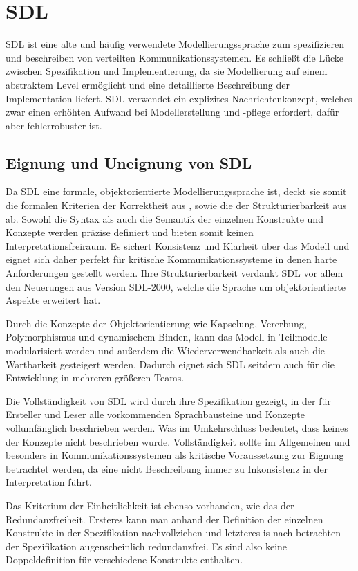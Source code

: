 \section{SDL}
\label{sc:SDLB}
\ac{SDL} ist eine alte und häufig verwendete Modellierungssprache zum spezifizieren und beschreiben von verteilten Kommunikationssystemen. 
Es schließt die Lücke zwischen Spezifikation und Implementierung, da sie Modellierung auf einem abstraktem Level ermöglicht und eine detaillierte Beschreibung der Implementation liefert. \ac{SDL} verwendet ein  explizites  Nachrichtenkonzept,  welches  zwar  einen  erhöhten  Aufwand  bei  Modellerstellung und -pflege erfordert, dafür aber fehlerrobuster ist. 
\subsection{Eignung und Uneignung von SDL}
\label{ssc:SDL_Eignung}
Da \ac{SDL} eine formale, objektorientierte Modellierungssprache ist, deckt sie somit die formalen Kriterien der Korrektheit aus \cite{ssc:Korrektheit}, sowie die der Strukturierbarkeit aus \cite{ssc:Strukturierbarkeit} ab. Sowohl die Syntax als auch die Semantik der einzelnen Konstrukte und Konzepte werden präzise definiert und bieten somit keinen Interpretationsfreiraum. Es sichert Konsistenz und Klarheit über das Modell und eignet sich daher perfekt für kritische Kommunikationssysteme in denen harte Anforderungen gestellt werden. Ihre Strukturierbarkeit verdankt \ac{SDL} vor allem den Neuerungen aus Version \ac{SDL}-2000, welche die Sprache um objektorientierte Aspekte erweitert hat.

Durch die Konzepte der Objektorientierung wie Kapselung, Vererbung, Polymorphismus und dynamischem Binden, kann das Modell in Teilmodelle modularisiert werden und außerdem die Wiederverwendbarkeit als auch die Wartbarkeit gesteigert werden. Dadurch eignet sich \ac{SDL} seitdem auch für die Entwicklung in mehreren größeren Teams. 

Die Vollständigkeit von \ac{SDL} wird durch ihre Spezifikation gezeigt, in der für Ersteller und Leser alle vorkommenden Sprachbausteine und Konzepte vollumfänglich beschrieben werden. Was im Umkehrschluss bedeutet, dass keines der Konzepte nicht beschrieben wurde. Vollständigkeit sollte im Allgemeinen und besonders in Kommunikationssystemen als kritische Voraussetzung zur Eignung betrachtet werden, da eine nicht Beschreibung immer zu Inkonsistenz in der Interpretation führt.

Das Kriterium der Einheitlichkeit ist ebenso vorhanden, wie das der Redundanzfreiheit. Ersteres kann man anhand der Definition der einzelnen Konstrukte in der Spezifikation nachvollziehen und letzteres is nach betrachten der Spezifikation augenscheinlich redundanzfrei. Es sind also keine Doppeldefinition für verschiedene Konstrukte enthalten. 

